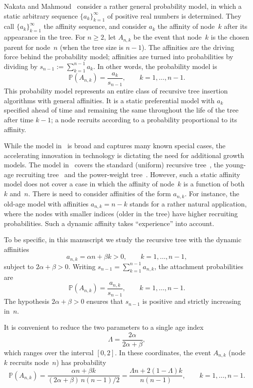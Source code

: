 \documentclass[11pt]{article}
\theoremstyle{remark}
\newcommand{\Pbb}{\mathbb{P}}
\begin{document}
Nakata and Mahmoud~\citep{nakata2024} consider a rather general probability
model, in which a static arbitrary sequence \(\{a_k\}_{k=1}^\infty\) of positive
real numbers is determined. They call \(\{a_k\}_{k=1}^\infty\) the affinity
sequence, and consider \(a_k\) the affinity of node~$k$ after its appearance in
the tree. For \(n\ge 2\), let \(A_{n,k}\) be the event that node~$k$ is the chosen
parent for node~$n$ (when the tree size is \(n-1\)). The affinities are the
driving force behind the probability model; affinities are turned into
probabilities by dividing by \(s_{n-1}:=\sum_{k=1}^{n-1}a_k\). In other words,
the probability model is
\[
\Pbb(A_{n,k})=\frac{a_k}{s_{n-1}},\qquad k=1,\ldots,n-1.
\]
This probability model represents an entire class of recursive tree insertion
algorithms with general affinities. It is a static preferential model with \(a_k\)
specified ahead of time and remaining the same throughout the life of the tree
after time \(k-1\); a node recruits according to a probability proportional to its
affinity.

While the model in~\citep{nakata2024} is broad and captures many known special
cases, the accelerating innovation in technology is dictating the need for
additional growth models. The model in~\citep{nakata2024} covers the standard
(uniform) recursive tree~\citep{drmota2009,frieze2016,hofri2018,smythe1995}, the
young-age recruiting tree~\citep{lyon2020} and the power-weight
tree~\citep{lyon2022}. However, such a static affinity model does not cover a
case in which the affinity of node~$k$ is a function of both \(k\) and~$n$. There
is need to consider affinities of the form \(a_{n,k}\). For instance, the old-age
model with affinities \(a_{n,k}=n-k\) stands for a rather natural application,
where the nodes with smaller indices (older in the tree) have higher recruiting
probabilities. Such a dynamic affinity takes ``experience'' into account.

To be specific, in this manuscript we study the recursive tree with the dynamic
affinities
\begin{equation}
a_{n,k}=\alpha n+\beta k>0,\qquad k=1,\ldots,n-1,
\label{eq:affinities}
\end{equation}
subject to \(2\alpha+\beta>0\). Writing \(s_{n-1}=\sum_{k=1}^{n-1}a_{n,k}\), the
attachment probabilities are
\[
\Pbb(A_{n,k})=\frac{a_{n,k}}{s_{n-1}},\qquad k=1,\ldots,n-1.
\]
The hypothesis \(2\alpha+\beta>0\) ensures that \(s_{n-1}\) is positive and
strictly increasing in~$n$.

It is convenient to reduce the two parameters to a single age index
\[
\Lambda=\frac{2\alpha}{2\alpha+\beta},
\]
which ranges over the interval \([0,2]\). In these coordinates, the event
\(A_{n,k}\) (node~$k$ recruits node~$n$) has probability
\[
\Pbb(A_{n,k})
=\frac{\alpha n+\beta k}{(2\alpha+\beta)\,n(n-1)/2}
=\frac{\Lambda n+2(1-\Lambda)k}{n(n-1)},
\qquad k=1,\ldots,n-1.
\]
\end{document}
